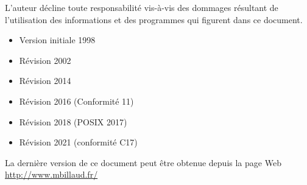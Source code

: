 L'auteur décline toute responsabilité vis-à-vis des dommages résultant
de l'utilisation des informations et des programmes qui figurent dans
ce document.


\begin{itemize}
\item Version initiale 1998
\item Révision 2002
\item Révision 2014
\item Révision 2016 (Conformité 11)
\item Révision 2018 (POSIX 2017)
\item Révision 2021 (conformité C17)
\end{itemize}

La dernière version de ce document peut être obtenue depuis la page Web
\url{http://www.mbillaud.fr/}
